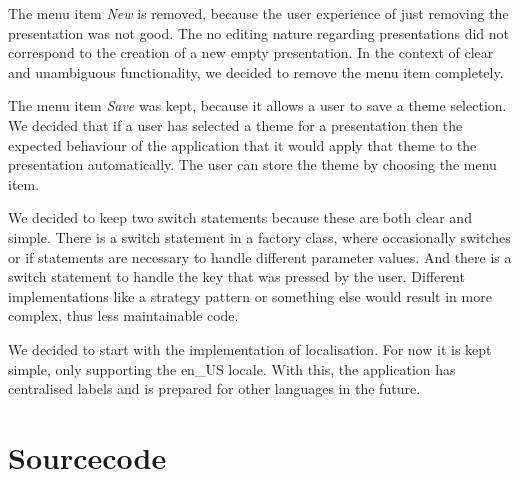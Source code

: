 \documentclass[a4paper]{article}
\begin{document}
The menu item \textit{New} is removed, because the user experience of just removing the presentation was not good. The no editing nature regarding presentations did not correspond to the creation of a new empty presentation. In the context of clear and unambiguous functionality, we decided to remove the menu item completely.

The menu item \textit{Save} was kept, because it allows a user to save a theme selection. We decided that if a user has selected a theme for a presentation then the expected behaviour of the application that it would apply that theme to the presentation automatically. The user can store the theme by choosing the menu item.

We decided to keep two switch statements because these are both clear and simple. There is a switch statement in a factory class, where occasionally switches or if statements are necessary to handle different parameter values. And there is a switch statement to handle the key that was pressed by the user. Different implementations like a strategy pattern or something else would result in more complex, thus less maintainable code.

We decided to start with the implementation of localisation. For now it is kept simple, only supporting the en\_US locale. With this, the application has centralised labels and is prepared for other languages in the future.   

\section{Sourcecode}
\end{document}
